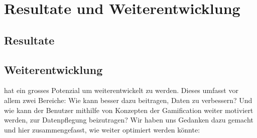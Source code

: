 \chapter{Resultate und Weiterentwicklung}
\label{pd-resultate}

\section{Resultate}

\section{Weiterentwicklung}
\label{pd-resultate-weiterentwicklung}

\kort{} hat ein grosses Potenzial um weiterentwickelt zu werden.
Dieses umfasst vor allem zwei Bereiche:
Wie kann \kort{} besser dazu beitragen,  Daten zu verbessern?
Und wie kann der Benutzer mithilfe von Konzepten der Gamification weiter motiviert werden, zur Datenpflegung beizutragen?\newline
Wir haben uns Gedanken dazu gemacht und hier zusammengefasst, wie \kort{} weiter optimiert werden könnte:
